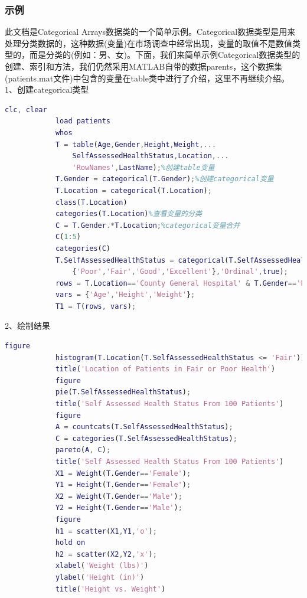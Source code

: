         \subsubsection{示例}
            此文档是Categorical Arrays数据类的一个简单示例。Categorical数据类型是用来处理分类数据的，这种数据(变量)在市场调查中经常出现，变量的取值不是数值类型的，而是分类的(例如：男、女)。下面，我们来简单示例Categorical数据类型的创建、索引和方法，我们仍然采用MATLAB自带的数据parents，这个数据集(patients.mat文件)中包含的变量在table类中进行了介绍，这里不再继续介绍。\\
            1、创建categorical类型
                \begin{lstlisting}[language=Matlab]
            clc, clear
            load patients
            whos
            T = table(Age,Gender,Height,Weight,...
                SelfAssessedHealthStatus,Location,...
                'RowNames',LastName);%创建table变量
            T.Gender = categorical(T.Gender);%创建categorical变量
            T.Location = categorical(T.Location);
            class(T.Location)
            categories(T.Location)%查看变量的分类
            C = T.Gender.*T.Location;%categorical变量合并
            C(1:5)
            categories(C)
            T.SelfAssessedHealthStatus = categorical(T.SelfAssessedHealthStatus,...
                {'Poor','Fair','Good','Excellent'},'Ordinal',true);
            rows = T.Location=='County General Hospital' & T.Gender=='Female';
            vars = {'Age','Height','Weight'};
            T1 = T(rows, vars);
                \end{lstlisting}
            2、绘制结果
                \begin{lstlisting}[language=Matlab]
            figure
            histogram(T.Location(T.SelfAssessedHealthStatus <= 'Fair'))
            title('Location of Patients in Fair or Poor Health')
            figure
            pie(T.SelfAssessedHealthStatus);
            title('Self Assessed Health Status From 100 Patients')
            figure
            A = countcats(T.SelfAssessedHealthStatus);
            C = categories(T.SelfAssessedHealthStatus);
            pareto(A, C);
            title('Self Assessed Health Status From 100 Patients')
            X1 = Weight(T.Gender=='Female');
            Y1 = Height(T.Gender=='Female');
            X2 = Weight(T.Gender=='Male');
            Y2 = Height(T.Gender=='Male');
            figure
            h1 = scatter(X1,Y1,'o');
            hold on
            h2 = scatter(X2,Y2,'x');
            xlabel('Weight (lbs)')
            ylabel('Height (in)')
            title('Height vs. Weight')
                \end{lstlisting}
